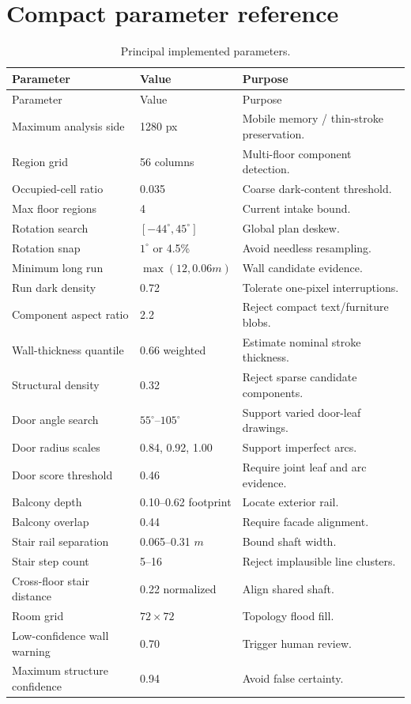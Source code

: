 \documentclass[11pt,a4paper]{article}
\begin{document}
\section{Compact parameter reference}

\begin{longtable}{@{}p{53mm}p{31mm}p{70mm}@{}}
\caption{Principal implemented parameters.}\label{tab:params}\\
\toprule
Parameter & Value & Purpose \\
\midrule
\endfirsthead
\toprule
Parameter & Value & Purpose \\
\midrule
\endhead
Maximum analysis side & 1280 px & Mobile memory / thin-stroke preservation. \\
Region grid & 56 columns & Multi-floor component detection. \\
Occupied-cell ratio & 0.035 & Coarse dark-content threshold. \\
Max floor regions & 4 & Current intake bound. \\
Rotation search & $[-44^\circ,45^\circ]$ & Global plan deskew. \\
Rotation snap & $1^\circ$ or 4.5\% & Avoid needless resampling. \\
Minimum long run & $\max(12,0.06m)$ & Wall candidate evidence. \\
Run dark density & 0.72 & Tolerate one-pixel interruptions. \\
Component aspect ratio & 2.2 & Reject compact text/furniture blobs. \\
Wall-thickness quantile & 0.66 weighted & Estimate nominal stroke thickness. \\
Structural density & 0.32 & Reject sparse candidate components. \\
Door angle search & $55^\circ$--$105^\circ$ & Support varied door-leaf drawings. \\
Door radius scales & 0.84, 0.92, 1.00 & Support imperfect arcs. \\
Door score threshold & 0.46 & Require joint leaf and arc evidence. \\
Balcony depth & 0.10--0.62 footprint & Locate exterior rail. \\
Balcony overlap & 0.44 & Require facade alignment. \\
Stair rail separation & 0.065--0.31 $m$ & Bound shaft width. \\
Stair step count & 5--16 & Reject implausible line clusters. \\
Cross-floor stair distance & 0.22 normalized & Align shared shaft. \\
Room grid & $72\times72$ & Topology flood fill. \\
Low-confidence wall warning & 0.70 & Trigger human review. \\
Maximum structure confidence & 0.94 & Avoid false certainty. \\
\bottomrule
\end{longtable}
\end{document}
